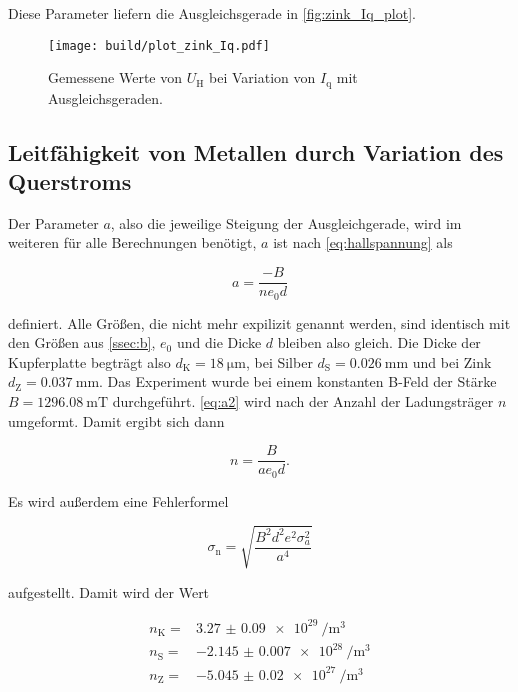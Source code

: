 Diese Parameter liefern die Ausgleichsgerade in \autoref{fig:zink_Iq_plot}.

\begin{figure}
    \centering
    \texttt{[image: build/plot\_zink\_Iq.pdf]}
    \caption{Gemessene Werte von $U_\text{H}$ bei Variation von $I_\text{q}$ mit Ausgleichsgeraden.\cite{numpy}}
    \label{fig:zink_Iq_plot}
\end{figure}

\subsection{Leitfähigkeit von Metallen durch Variation des Querstroms}
\label{ssec:d}

Der Parameter $a$, also die jeweilige Steigung der Ausgleichgerade, wird im weiteren für alle Berechnungen benötigt, $a$ ist nach \autoref{eq:hallspannung} als 

\begin{equation}
    a = \frac{-B}{n e_0 d}
    \label{eq:a2}
\end{equation}

definiert.
Alle Größen, die nicht mehr expilizit genannt werden, sind identisch mit den Größen aus \autoref{ssec:b}, $e_0$ und die Dicke $d$ bleiben also gleich.
Die Dicke der Kupferplatte begträgt also $d_\text{K} = \SI{18}{\micro\meter}$, bei Silber $d_\text{S} = \SI{0.026}{\milli\meter}$ und bei Zink $d_\text{Z} = \SI{0.037}{\milli\meter}$.
Das Experiment wurde bei einem konstanten B-Feld der Stärke $B = \SI{1296.08}{\milli\tesla}$ durchgeführt.
\autoref{eq:a2} wird nach der Anzahl der Ladungsträger $n$ umgeformt.
Damit ergibt sich dann

\begin{equation}
    n = \frac{B}{a e_0 d}.
    \label{eq:n2}
\end{equation}

Es wird außerdem eine Fehlerformel 

\begin{equation}
    \sigma _\text{n} = \sqrt{\frac {B^{2} d^{2} e^{2} \sigma_{a}^{2} }{a^{4}}}
    \label{eq:n2_fehler}
\end{equation}

aufgestellt.
Damit wird der Wert

\begin{align*}
    n_\text{K} =& \SI{3.27(9)e29}{\per\cubic\meter}\\
    n_\text{S} =& \SI{-2.145(7)e28}{\per\cubic\meter}\\
    n_\text{Z} =& \SI{-5.045(20)e27}{\per\cubic\meter}
\end{align*}

